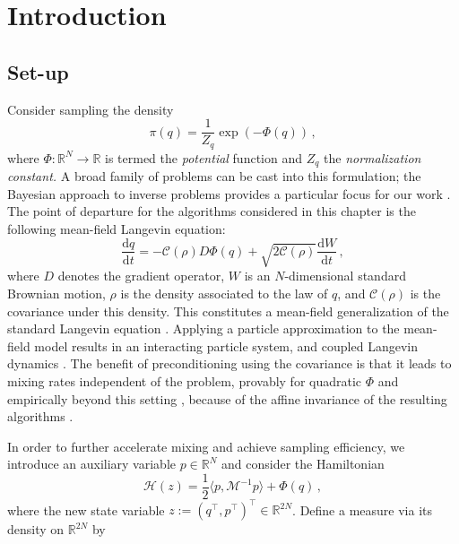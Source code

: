 \documentclass[12pt]{caltech_thesis}
\numberwithin{equation}{section}
\begin{document}
\section{Introduction}
    \subsection{Set-up}
    Consider sampling the density $$\pi(q)=\frac{1}{Z_q}\exp(-\Phi(q))\,,$$ where $\Phi: \mathbb{R}^{N} \to \mathbb{R}$ is termed the \emph{potential} function and $Z_q$  the \emph{normalization constant.}
    A broad family of problems can be cast into this formulation; the Bayesian approach to inverse problems provides a particular focus for our work \cite{kaipio2006statistical}. 
        The point of departure for the algorithms considered in this chapter is the following mean-field
    Langevin equation:
\begin{equation}
\label{eqol}
\frac{\mathrm{d} q}{\mathrm{d} t}=-\mathcal{C}(\rho) D \Phi(q)+\sqrt{2 \mathcal{C}(\rho)} \frac{\mathrm{d} W}{\mathrm{d} t}\,,
\end{equation}
where $D$ {denotes} the gradient operator, $W$ is an $N$-dimensional standard Brownian motion, $\rho$ is the density associated to the law of $q$, and $\mathcal{C}(\rho)$ is the covariance under this density. This
constitutes a mean-field generalization \cite{garbuno2020interacting} of the standard Langevin
equation \cite{pavliotis2014stochastic}. Applying a particle approximation to the mean-field
model results in an interacting particle system, and coupled Langevin dynamics 
\cite{leimkuhler2018ensemble,garbuno2020interacting,nusken2019note,garbuno2020affine}. 
The benefit of preconditioning using the covariance is that it leads to
mixing rates independent of the problem, provably for quadratic $\Phi$ and
empirically beyond this setting \cite{garbuno2020interacting}, 
{because of the affine invariance \cite{goodman2010ensemble} of the
resulting algorithms \cite{garbuno2020affine}.}
   
    
   

    In order to {further} accelerate mixing and achieve sampling efficiency, 
    we introduce an auxiliary variable  $p\in \mathbb{R}^{N}$ and consider the Hamiltonian \begin{equation}
    \label{ham}
        \mathcal{H}(z)=\frac{1}{2}\langle p,\mathcal{M}^{-1}p\rangle+\Phi(q)\,,
    \end{equation} where the new state variable $z:=(q^\top, p^\top)^\top \in\mathbb{R}^{2N}$. Define a measure {via its density} on $\mathbb{R}^{2N}$ by
     
\end{document}
